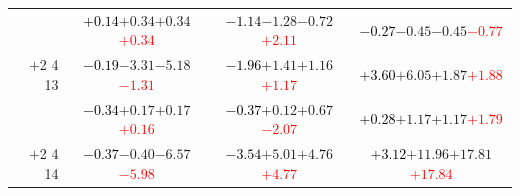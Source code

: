 \documentclass[compress]{beamer}
\begin{document}
\begin{frame}
\begin{tabular}{r | c | c | c}
          & \textcolor{black}{$+0.14$}\hspace{0.1 cm}$+0.34$\hspace{0.1 cm}$+0.34$\hspace{0.1 cm}\textcolor{red}{$+0.34$} & \textcolor{black}{$-1.14$}\hspace{0.1 cm}$-1.28$\hspace{0.1 cm}$-0.72$\hspace{0.1 cm}\textcolor{red}{$+2.11$} & \textcolor{black}{$-0.27$}\hspace{0.1 cm}$-0.45$\hspace{0.1 cm}$-0.45$\hspace{0.1 cm}\textcolor{red}{$-0.77$} \\
$+$2 4 13 & \textcolor{black}{$-0.19$}\hspace{0.1 cm}$-3.31$\hspace{0.1 cm}$-5.18$\hspace{0.1 cm}\textcolor{red}{$-1.31$} & \textcolor{black}{$-1.96$}\hspace{0.1 cm}$+1.41$\hspace{0.1 cm}$+1.16$\hspace{0.1 cm}\textcolor{red}{$+1.17$} & \textcolor{black}{$+3.60$}\hspace{0.1 cm}$+6.05$\hspace{0.1 cm}$+1.87$\hspace{0.1 cm}\textcolor{red}{$+1.88$} \\
          & \textcolor{black}{$-0.34$}\hspace{0.1 cm}$+0.17$\hspace{0.1 cm}$+0.17$\hspace{0.1 cm}\textcolor{red}{$+0.16$} & \textcolor{black}{$-0.37$}\hspace{0.1 cm}$+0.12$\hspace{0.1 cm}$+0.67$\hspace{0.1 cm}\textcolor{red}{$-2.07$} & \textcolor{black}{$+0.28$}\hspace{0.1 cm}$+1.17$\hspace{0.1 cm}$+1.17$\hspace{0.1 cm}\textcolor{red}{$+1.79$} \\
$+$2 4 14 & \textcolor{black}{$-0.37$}\hspace{0.1 cm}$-0.40$\hspace{0.1 cm}$-6.57$\hspace{0.1 cm}\textcolor{red}{$-5.98$} & \textcolor{black}{$-3.54$}\hspace{0.1 cm}$+5.01$\hspace{0.1 cm}$+4.76$\hspace{0.1 cm}\textcolor{red}{$+4.77$} & \textcolor{black}{$+3.12$}\hspace{0.1 cm}$+11.96$\hspace{0.1 cm}$+17.81$\hspace{0.1 cm}\textcolor{red}{$+17.84$} \\

\end{tabular}
\end{frame}
\end{document}
